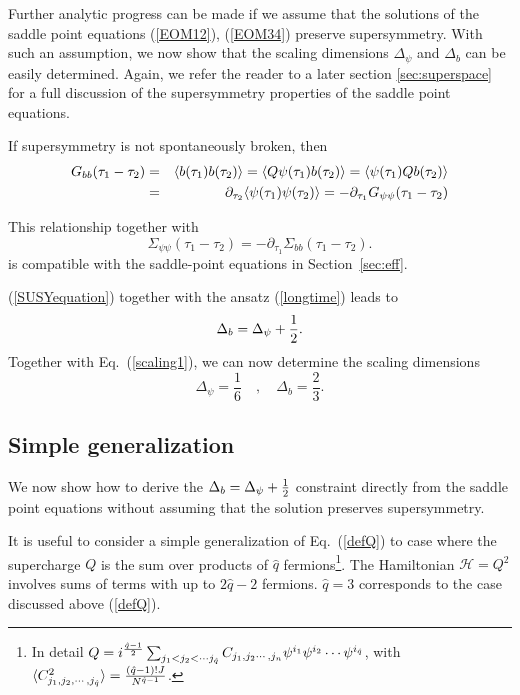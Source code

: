 \documentclass[aps,pre,preprint,onecolumn,citeautoscript,superscriptaddress,nofootinbib,eqsecnum]{revtex4-1}
\newcommand{\beq}{\begin{equation}}
\newcommand{\eeq}{\end{equation}}
\def\nref#1{(\ref{#1})}
\def\half{{1 \over 2 }}
\begin{document}
Further analytic progress can be made if we assume that the solutions of the saddle point equations (\ref{EOM12}), (\ref{EOM34})
preserve supersymmetry. With such an assumption, we now show that the scaling dimensions $\Delta_\psi$ and $\Delta_b$ 
can be easily determined. Again, we refer the reader to a later section \ref{sec:superspace}  for a full discussion of the supersymmetry properties of the saddle point equations. 

If supersymmetry is not spontaneously broken, then
\begin{eqnarray} 
G_{bb}(\tau_1-\tau_2) &=& \langle b(\tau_1)b(\tau_2)\rangle=\langle Q\psi(\tau_1) b(\tau_2)\rangle=\langle\psi(\tau_1)Qb(\tau_2)\rangle
\notag 
\\
&=&\partial_{\tau_2}\langle\psi(\tau_1)\psi(\tau_2)\rangle = -\partial_{\tau_1}G_{\psi \psi}(\tau_1-\tau_2) \label{SUSYequation}
\end{eqnarray}

This relationship together with 
\beq
\Sigma_{\psi \psi}(\tau_1-\tau_2)=-\partial_{\tau_1}\Sigma_{bb}(\tau_1-\tau_2). \label{SUSYSigma}
\eeq
is compatible with the saddle-point equations in Section~\ref{sec:eff}.

 \nref{SUSYequation}  together with the ansatz \nref{longtime} leads to  
\beq
\Delta_{b}= \Delta_{\psi} + \half . \label{SusyW}
\eeq
 Together with Eq.~(\ref{scaling1}), we can now determine the scaling dimensions
 \beq
 \Delta_{\psi}=\frac{1}{6} \quad , \quad \Delta_b=\frac{2}{3}. \label{eq:dim}
 \eeq
 
 \subsection{Simple  generalization }
 
We now show how to derive the $\Delta_b = \Delta_\psi + \half$ constraint directly from the saddle point equations 
without assuming that the solution preserves supersymmetry. 

It is useful to consider a simple generalization of   Eq.~(\ref{defQ}) to case where the supercharge $Q$ is the sum over products of $\hat q$ fermions\footnote{
In detail $Q = i^{ \hat q -1 \over 2 } \sum_{j_1 < j_2 < \cdots j_{\hat q} } C_{j_1,j_2 \cdots,j_n} \psi^{i_1} \psi^{i_2} \cdots \psi^{i_{\hat q}} $, with 
$\langle C_{j_1 , j_2, \cdots, j_{\hat q} }^2 \rangle = { (\hat q -1)! J \over N^{\hat q -1} }$.}. The Hamiltonian $\mathcal{H}=Q^2$ involves sums of terms with 
up to $ 2\hat q -2$ fermions. $\hat q=3$ corresponds to the case discussed above \nref{defQ}. 
 
\end{document}
